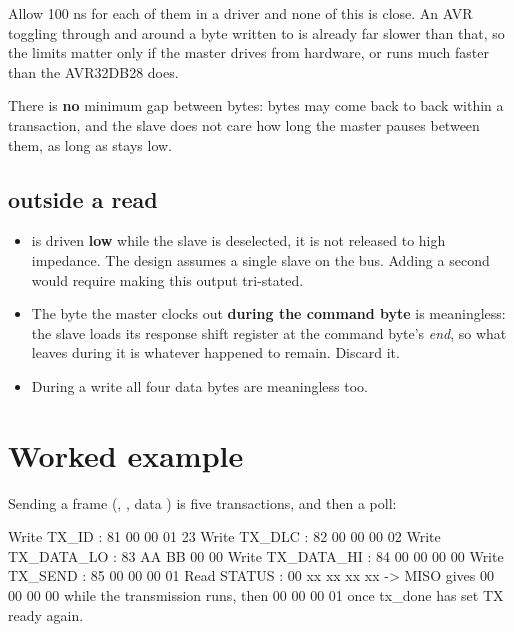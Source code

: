 Allow 100 ns for each of them in a driver and none of this is close. An AVR toggling  through
 and  around a byte written to  is already far
slower than that, so the limits matter only if the master drives  from hardware, or runs much
faster than the AVR32DB28 does.

There is \textbf{no} minimum gap between bytes: bytes may come back to back within a transaction, and
the slave does not care how long the master pauses between them, as long as  stays low.

\subsection{ outside a read}
\label{app:protocol:miso}

\begin{itemize}
  \item {} is driven \textbf{low} while the slave is deselected, it is not released to high
    impedance. The design assumes a single slave on the bus. Adding a second would require making this
    output tri-stated.
  \item The byte the master clocks out \textbf{during the command byte} is meaningless: the slave
    loads its response shift register at the command byte's \emph{end}, so what leaves during it is
    whatever happened to remain. Discard it.
  \item During a write all four  data bytes are meaningless too.
\end{itemize}

\section{Worked example}
\label{app:protocol:example}

Sending a frame (, , data ) is five transactions, and then a
poll:

\begin{widedrawing}
Write TX_ID      : 81 00 00 01 23
Write TX_DLC     : 82 00 00 00 02
Write TX_DATA_LO : 83 AA BB 00 00
Write TX_DATA_HI : 84 00 00 00 00
Write TX_SEND    : 85 00 00 00 01
Read  STATUS     : 00 xx xx xx xx   -> MISO gives 00 00 00 00 while the transmission runs,
                                       then 00 00 00 01 once tx_done has set TX ready again.
\end{widedrawing}

